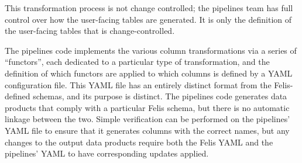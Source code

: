 This transformation process is not change controlled; the pipelines team has full control over how
the user-facing tables are generated. It is only the definition of the user-facing tables that is
change-controlled.

The pipelines code implements the various column transformations via a series of ``functors'', each
dedicated to a particular type of transformation, and the definition of which functors are applied
to which columns is defined by a YAML configuration file. This YAML file has an entirely distinct
format from the Felis-defined schemas, and its purpose is distinct. The pipelines code generates
data products that comply with a particular Felis schema, but there is no automatic linkage between
the two. Simple verification can be performed on the pipelines' YAML file to ensure that it
generates columns with the correct names, but any changes to the output data products require both
the Felis YAML and the pipelines' YAML to have corresponding updates applied.


